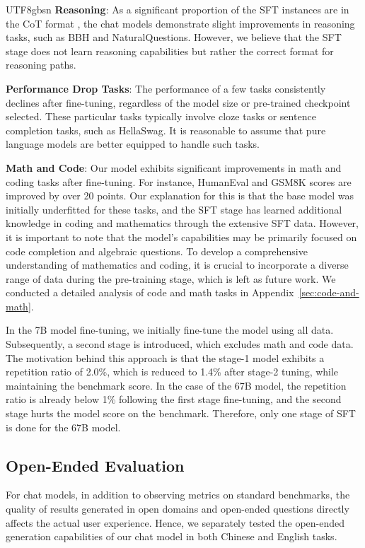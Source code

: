 \documentclass[11pt, a4paper, logo, copyright, nonumbering]{deepseek}
\begin{document}
\begin{CJK*}{UTF8}{gbsn}
\textbf{Reasoning}: As a significant proportion of the SFT instances are in the CoT format \cite{cot}, the chat models demonstrate slight improvements in reasoning tasks, such as BBH and NaturalQuestions. However, we believe that the SFT stage does not learn reasoning capabilities but rather  the correct format for reasoning paths.

\textbf{Performance Drop Tasks}: The performance of a few tasks consistently declines after fine-tuning, regardless of the model size or pre-trained checkpoint selected. These particular tasks typically involve cloze tasks or sentence completion tasks, such as HellaSwag. It is reasonable to assume that pure language models are better equipped to handle such tasks.

\textbf{Math and Code}: Our model exhibits significant improvements in math and coding tasks after fine-tuning. For instance, HumanEval and GSM8K scores are improved by over 20 points.
Our explanation for this is that the base model was initially underfitted for these tasks, and the SFT stage has learned additional knowledge in coding and mathematics through the extensive SFT data. However, it is important to note that the model's capabilities may be primarily focused on code completion and algebraic questions. To develop a comprehensive understanding of mathematics and coding, it is crucial to incorporate a diverse range of data during the pre-training stage, which is left as future work. We conducted a detailed analysis of code and math tasks in Appendix~\ref{sec:code-and-math}. 

In the 7B model fine-tuning, we initially fine-tune the model using all data. Subsequently, a second stage is introduced, which excludes math and code data. The motivation behind this approach is that the stage-1 model exhibits a repetition ratio of 2.0\%, which is reduced to 1.4\% after stage-2 tuning, while maintaining the benchmark score. In the case of the 67B model, the repetition ratio is already below 1\% following the first stage fine-tuning, and the second stage hurts the model score on the benchmark. Therefore, only one stage of SFT is done for the 67B model. 



\subsection{Open-Ended Evaluation}
For chat models, in addition to observing metrics on standard benchmarks, the quality of results generated in open domains and open-ended questions directly affects the actual user experience. 
Hence, we separately tested the open-ended generation capabilities of our chat model in both Chinese and English tasks.


\end{CJK*}
\end{document}
